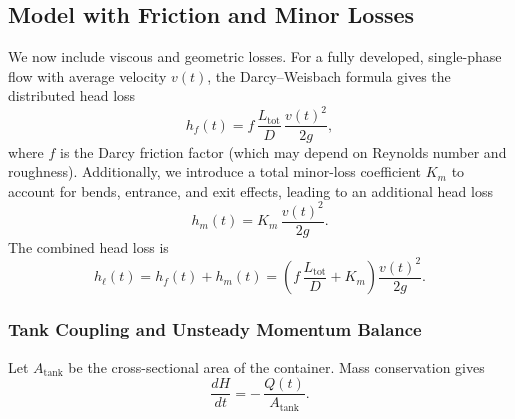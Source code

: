 \documentclass[11pt]{article}
\begin{document}
\subsection{Model with Friction and Minor Losses}
\label{sec:friction-losses}

We now include viscous and geometric losses.
For a fully developed, single-phase flow with average velocity $v(t)$, the Darcy--Weisbach formula gives the distributed head loss
\begin{equation}
  h_f(t) = f \,\frac{L_{\text{tot}}}{D} \,\frac{v(t)^2}{2g},
\end{equation}
where $f$ is the Darcy friction factor (which may depend on Reynolds number and roughness).
Additionally, we introduce a total minor-loss coefficient $K_m$ to account for bends, entrance, and exit effects, leading to an additional head loss
\begin{equation}
  h_m(t) = K_m \,\frac{v(t)^2}{2g}.
\end{equation}
The combined head loss is
\begin{equation}
  h_{\ell}(t) = h_f(t) + h_m(t)
  = \left( f\,\frac{L_{\text{tot}}}{D} + K_m \right)\frac{v(t)^2}{2g}.
\end{equation}

\subsubsection*{Tank Coupling and Unsteady Momentum Balance}

Let $A_{\text{tank}}$ be the cross-sectional area of the container.
Mass conservation gives
\begin{equation}
  \frac{dH}{dt} = -\,\frac{Q(t)}{A_{\text{tank}}}.
\end{equation}
\end{document}
